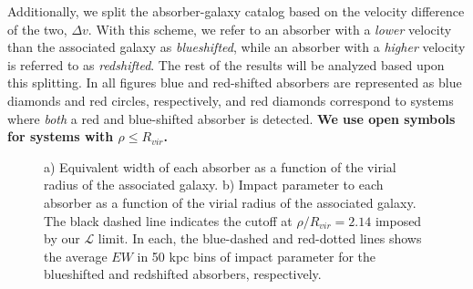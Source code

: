 \documentclass[twocolumn,tighten]{aastex6}
\begin{document}
Additionally, we split the absorber-galaxy catalog based on the velocity difference of the two, $\Delta v$. With this scheme, we refer to an absorber with a \textit{lower} velocity than the associated galaxy as \textit{blueshifted}, while an absorber with a \textit{higher} velocity is referred to as \textit{redshifted}. The rest of the results will be analyzed based upon this splitting. In all figures blue and red-shifted absorbers are represented as blue diamonds and red circles, respectively, and red diamonds correspond to systems where \textit{both} a red and blue-shifted absorber is detected. \textbf{We use open symbols for systems with $\rho \leq R_{vir}$.}


\begin{figure}[ht]
\centering
{}
\caption{\small{a) Equivalent width of each absorber as a function of the virial radius of the associated galaxy. b) Impact parameter to each absorber as a function of the virial radius of the associated galaxy. The black dashed line indicates the cutoff at $\rho/R_{vir} =2.14$ imposed by our $\mathcal{L}$ limit.} In each, the blue-dashed and red-dotted lines shows the average $EW$ in 50 kpc bins of impact parameter for the blueshifted and redshifted absorbers, respectively. }
\vspace{5pt}
\end{figure}


\vspace{10pt}
\end{document}
